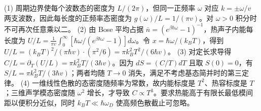 (1) 周期边界使每个波数态的密度为 \(L/(2\pi)\)，但同一正频率 \(\omega\) 对应 \(k=\pm\omega/v\) 两支波数，因此每长度的正频率态密度为 \(g(\omega)/L=1/(\pi v)\)。对 \(\omega>0\) 积分时不可再次任意乘以二。
(2) 由 Bose 平均占据 \(\bar n=(e^{\beta\hbar\omega}-1)^{-1}\)，热声子内能每长度为 \(U/L=\frac1{\pi v}\int_0^\infty[\hbar\omega/(e^{\beta\hbar\omega}-1)]d\omega\)。令 \(x=\hbar\omega/(k_BT)\)，得到 \(U/L=(k_BT)^2/(\pi\hbar v)\cdot(\pi^2/6)=\pi k_B^2T^2/(6\hbar v)\)。
(3) 对定长求导得 \(C/L=\partial_T(U/L)=\pi k_B^2T/(3\hbar v)\)。因为 \(dS=(C/T)dT\) 且取 \(S(0)=0\)，有 \(S/L=\pi k_B^2T/(3\hbar v)\)；两者均随 \(T\to0\) 消失，满足不考虑基态简并时的第三定律。
(4) 一维线性色散的态密度随频率为常数，故内能标度是 \(T^2\)、热容标度是 \(T\)；三维声学模态密度随 \(\omega^2\) 增长，才导致 \(C\propto T^3\)。要求热能高于有限长最低模间距以便积分近似，同时 \(k_BT\ll\hbar\omega_D\) 使高频色散截止可忽略。
